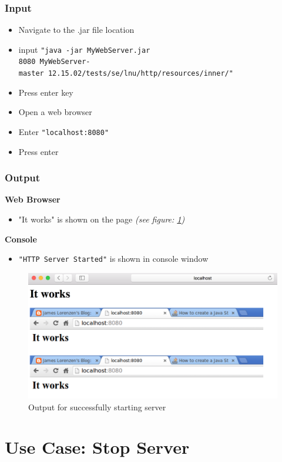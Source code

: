 \documentclass[a4paper, 12pt]{article}
\begin{document}
\subsubsection{Input}
\begin{itemize}
\item Navigate to the .jar file location
\item input \texttt{"java -jar MyWebServer.jar \\
8080 MyWebServer-master\ 12.15.02/tests/se/lnu/http/resources/inner/"}
\item Press enter key
\item Open a web browser
\item Enter \texttt{"localhost:8080"}
\item Press enter
\end{itemize}

\subsubsection{Output}
\textbf{Web Browser}
\begin{itemize}
\item "It works" is shown on the page \textit{(see figure: \ref{TC1.1})}
\end{itemize}

\textbf{Console}
\begin{itemize}
\item \texttt{"HTTP Server Started"} is shown in console window
\end{itemize}

\begin{figure}[h]
\includegraphics[scale=0.5]{output_clarification/TC1-1.png} 
\caption{Output for successfully starting server}
\label{TC1.1}
\end{figure}

\section{Use Case: Stop Server}
\end{document}
